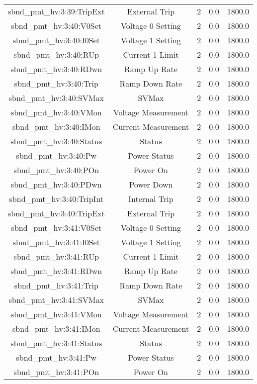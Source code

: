 \begin{center}
\begin{longtable}{c | c c c c }
sbnd\_pmt\_hv:3:39:TripExt & External Trip & 2 & 0.0 & 1800.0\\ 
sbnd\_pmt\_hv:3:40:V0Set & Voltage 0 Setting & 2 & 0.0 & 1800.0\\ 
sbnd\_pmt\_hv:3:40:I0Set & Voltage 1 Setting & 2 & 0.0 & 1800.0\\ 
sbnd\_pmt\_hv:3:40:RUp & Current 1 Limit & 2 & 0.0 & 1800.0\\ 
sbnd\_pmt\_hv:3:40:RDwn & Ramp Up Rate & 2 & 0.0 & 1800.0\\ 
sbnd\_pmt\_hv:3:40:Trip & Ramp Down Rate & 2 & 0.0 & 1800.0\\ 
sbnd\_pmt\_hv:3:40:SVMax & SVMax & 2 & 0.0 & 1800.0\\ 
sbnd\_pmt\_hv:3:40:VMon & Voltage Measurement & 2 & 0.0 & 1800.0\\ 
sbnd\_pmt\_hv:3:40:IMon & Current Measurement & 2 & 0.0 & 1800.0\\ 
sbnd\_pmt\_hv:3:40:Status & Status & 2 & 0.0 & 1800.0\\ 
sbnd\_pmt\_hv:3:40:Pw & Power Status & 2 & 0.0 & 1800.0\\ 
sbnd\_pmt\_hv:3:40:POn & Power On & 2 & 0.0 & 1800.0\\ 
sbnd\_pmt\_hv:3:40:PDwn & Power Down & 2 & 0.0 & 1800.0\\ 
sbnd\_pmt\_hv:3:40:TripInt & Internal Trip & 2 & 0.0 & 1800.0\\ 
sbnd\_pmt\_hv:3:40:TripExt & External Trip & 2 & 0.0 & 1800.0\\ 
sbnd\_pmt\_hv:3:41:V0Set & Voltage 0 Setting & 2 & 0.0 & 1800.0\\ 
sbnd\_pmt\_hv:3:41:I0Set & Voltage 1 Setting & 2 & 0.0 & 1800.0\\ 
sbnd\_pmt\_hv:3:41:RUp & Current 1 Limit & 2 & 0.0 & 1800.0\\ 
sbnd\_pmt\_hv:3:41:RDwn & Ramp Up Rate & 2 & 0.0 & 1800.0\\ 
sbnd\_pmt\_hv:3:41:Trip & Ramp Down Rate & 2 & 0.0 & 1800.0\\ 
sbnd\_pmt\_hv:3:41:SVMax & SVMax & 2 & 0.0 & 1800.0\\ 
sbnd\_pmt\_hv:3:41:VMon & Voltage Measurement & 2 & 0.0 & 1800.0\\ 
sbnd\_pmt\_hv:3:41:IMon & Current Measurement & 2 & 0.0 & 1800.0\\ 
sbnd\_pmt\_hv:3:41:Status & Status & 2 & 0.0 & 1800.0\\ 
sbnd\_pmt\_hv:3:41:Pw & Power Status & 2 & 0.0 & 1800.0\\ 
sbnd\_pmt\_hv:3:41:POn & Power On & 2 & 0.0 & 1800.0\\ 

\end{longtable}
\end{center}
